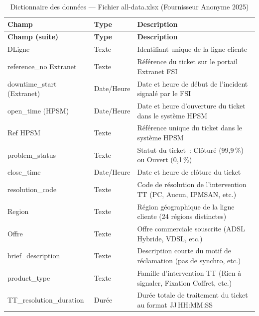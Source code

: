 \documentclass[10pt,a4paper]{report}
\begin{document}
\begin{longtable}{L{4cm} L{2.5cm} L{7cm}}
\caption{Dictionnaire des données --- Fichier all-data.xlsx (Fournisseur Anonyme 2025)} \label{tab:dict} \\
\toprule
{}
\textbf{\color{ttblue}Champ} & \textbf{\color{ttblue}Type} & \textbf{\color{ttblue}Description} \\
\midrule
\endfirsthead
\toprule
{}
\textbf{\color{ttblue}Champ (suite)} & \textbf{\color{ttblue}Type} & \textbf{\color{ttblue}Description} \\
\midrule
\endhead
\bottomrule
\endfoot
DLigne                      & Texte      & Identifiant unique de la ligne cliente \\
reference\_no Extranet      & Texte      & Référence du ticket sur le portail Extranet FSI \\
downtime\_start (Extranet)  & Date/Heure & Date et heure de début de l'incident signalé par le FSI \\
open\_time (HPSM)           & Date/Heure & Date et heure d'ouverture du ticket dans le système HPSM \\
Ref HPSM                    & Texte      & Référence unique du ticket dans le système HPSM \\
problem\_status             & Texte      & Statut du ticket~: Clôturé (99,9\,\%) ou Ouvert (0,1\,\%) \\
close\_time                 & Date/Heure & Date et heure de clôture du ticket \\
resolution\_code            & Texte      & Code de résolution de l'intervention TT (PC, Aucun, IPMSAN, etc.) \\
Region                      & Texte      & Région géographique de la ligne cliente (24 régions distinctes) \\
Offre                       & Texte      & Offre commerciale souscrite (ADSL Hybride, VDSL, etc.) \\
brief\_description          & Texte      & Description courte du motif de réclamation (pas de synchro, etc.) \\
product\_type               & Texte      & Famille d'intervention TT (Rien à signaler, Fixation Coffret, etc.) \\
TT\_resolution\_duration    & Durée      & Durée totale de traitement du ticket au format JJ\,HH:MM:SS \\
\end{longtable}
\end{document}
